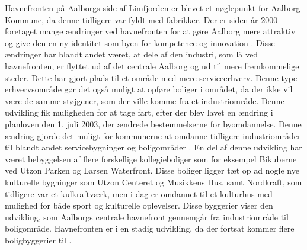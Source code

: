 \newline \indent{     }  Havnefronten på Aalborgs side af Limfjorden er blevet et nøglepunkt for Aalborg Kommune, da denne tidligere var fyldt med fabrikker. Der er siden år 2000 foretaget mange ændringer ved havnefronten for at gøre Aalborg mere attraktiv og give den en ny identitet som byen for kompetence og innovation \citep{brugerhavnen}.
\newline \indent{     }  Disse ændringer har blandt andet været, at dele af den industri, som lå ved havnefronten, er flyttet ud af det centrale Aalborg og ud til mere fremkommelige steder. Dette har gjort plads til et område med mere serviceerhverv. Denne type erhvervsområde gør det også muligt at opføre boliger i området, da der ikke vil være de samme støjgener, som der ville komme fra et industriområde. Denne udvikling fik muligheden for at tage fart, efter der blev lavet en ændring i planloven den 1. juli 2003, der ændrede bestemmelserne for byomdannelse. Denne ændring gjorde det muligt for kommunerne at omdanne tidligere industriområder til blandt andet servicebygninger og boligområder \citep{sort}.
En del af denne udvikling har været bebyggelsen af flere forskellige kollegieboliger som for eksempel Bikuberne ved Utzon Parken og Larsen Waterfront. Disse boliger ligger tæt op ad nogle nye kulturelle bygninger som Utzon Centeret og Musikkens Hus, samt Nordkraft, som tidligere var et kulkraftværk, men i dag er omdannet til et kulturhus med mulighed for både sport og kulturelle oplevelser. Disse byggerier viser den udvikling, som Aalborgs centrale havnefront gennemgår fra industriområde til boligområde. Havnefronten er i en stadig udvikling, da der fortsat kommer flere boligbyggerier til \citep{havnefronterne}.